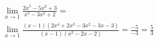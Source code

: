 \begin{ex}
\begin{align}
&\lim_{x\rightarrow 1} \frac{2x^5-5x^3+3}{x^3-3x^2+2}=\nonumber\\
&\lim_{x\rightarrow 1} \frac{(x-1)(2x^4+2x^3-3x^2-3x-3)}{(x-1)(x^2-2x-2)}=\frac{-5}{-3}=\frac{5}{3}\nonumber
\end{align}
\end{ex}
